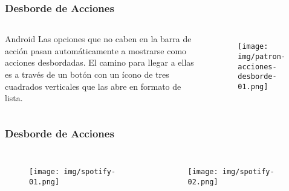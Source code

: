 \documentclass{beamer}
\begin{document}

\begin{frame}
\frametitle{Desborde de Acciones}

\begin{columns}[c] %

\begin{block}{Android}
\justify
Las opciones que no caben en la barra de acción pasan automáticamente a mostrarse como acciones desbordadas. El camino para llegar a ellas es a través de un botón con un ícono de tres cuadrados verticales que las abre en formato de lista.
\end{block}

\begin{figure}[H]
  \centering
  \texttt{[image: img/patron-acciones-desborde-01.png]}
\end{figure}
\end{columns}
\end{frame}


\begin{frame}
\frametitle{Desborde de Acciones}

\begin{columns}[c] %

\begin{figure}[H]
  \centering
  \texttt{[image: img/spotify-01.png]}
\end{figure}

\begin{figure}[H]
  \centering
  \texttt{[image: img/spotify-02.png]}
\end{figure}

\end{columns}
\end{frame}

\end{document}
